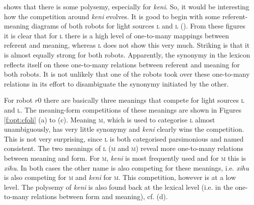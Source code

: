  shows that there is some polysemy, especially for {\it keni}. So, it would be interesting how the competition around {\it keni} evolves. It is good to begin with some referent-meaning diagrams of both robots for light sources \textsc{l} and \textsc{l} (). From these figures it is clear that for \textsc{l} there is a high level of one-to-many mappings between referent and meaning, whereas \textsc{l} does not show this very much. Striking is that it is almost equally strong for both robots. Apparently, the synonymy in the lexicon reflects itself on these one-to-many relations between referent and meaning for both robots. It is not unlikely that one of the robots took over these one-to-many relations in its effort to disambiguate the synonymy initiated by the other.

For robot $r0$ there are basically three meanings that compete for light sources \textsc{l} and \textsc{l}. The meaning-form competitions of these meanings are shown in Figures \ref{f:opt:cfoli} (a) to (c). Meaning \textsc{m}, which is used to categorise \textsc{l} almost unambiguously, has very little synonymy and {\it keni} clearly wins the competition. This is not very surprising, since \textsc{l} is both categorised parsimonious and named consistent. The two meanings of \textsc{l} (\textsc{m} and \textsc{m}) reveal more one-to-many relations between meaning and form. For \textsc{m}, {\it keni} is most frequently used and for \textsc{m} this is {\it xihu}. In both cases the other name is also competing for these meanings, i.e. {\it xihu} is also competing for \textsc{m} and {\it keni} for \textsc{m}. This competition, however is at a low level. The polysemy of {\it keni} is also found back at the lexical level (i.e. in the one-to-many relations between form and meaning), cf.  (d). 

